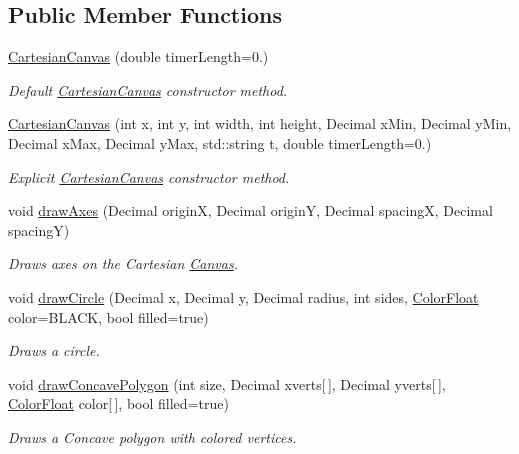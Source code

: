 \subsection*{Public Member Functions}
\begin{DoxyCompactItemize}
\item 
\hyperlink{classtsgl_1_1_cartesian_canvas_a4438f368eae3def6a70e0faa15d28daa}{Cartesian\+Canvas} (double timer\+Length=0.)
\begin{DoxyCompactList}\small\item\em Default \hyperlink{classtsgl_1_1_cartesian_canvas}{Cartesian\+Canvas} constructor method. \end{DoxyCompactList}\item 
\hyperlink{classtsgl_1_1_cartesian_canvas_a7ca80bfa69d89fdbe110a7ec3aa6f100}{Cartesian\+Canvas} (int x, int y, int width, int height, Decimal x\+Min, Decimal y\+Min, Decimal x\+Max, Decimal y\+Max, std\+::string t, double timer\+Length=0.)
\begin{DoxyCompactList}\small\item\em Explicit \hyperlink{classtsgl_1_1_cartesian_canvas}{Cartesian\+Canvas} constructor method. \end{DoxyCompactList}\item 
void \hyperlink{classtsgl_1_1_cartesian_canvas_a1b08e3c0d692603fd2bf56e38eb19907}{draw\+Axes} (Decimal origin\+X, Decimal origin\+Y, Decimal spacing\+X, Decimal spacing\+Y)
\begin{DoxyCompactList}\small\item\em Draws axes on the Cartesian \hyperlink{classtsgl_1_1_canvas}{Canvas}. \end{DoxyCompactList}\item 
void \hyperlink{classtsgl_1_1_cartesian_canvas_a64e128195cbcf9b60dbe478d6f489d67}{draw\+Circle} (Decimal x, Decimal y, Decimal radius, int sides, \hyperlink{structtsgl_1_1_color_float}{Color\+Float} color=B\+L\+A\+C\+K, bool filled=true)
\begin{DoxyCompactList}\small\item\em Draws a circle. \end{DoxyCompactList}\item 
void \hyperlink{classtsgl_1_1_cartesian_canvas_a7f84b79ab6fd77277c5c71fce7d0ec6a}{draw\+Concave\+Polygon} (int size, Decimal xverts\mbox{[}$\,$\mbox{]}, Decimal yverts\mbox{[}$\,$\mbox{]}, \hyperlink{structtsgl_1_1_color_float}{Color\+Float} color\mbox{[}$\,$\mbox{]}, bool filled=true)
\begin{DoxyCompactList}\small\item\em Draws a Concave polygon with colored vertices. \end{DoxyCompactList}\item 

\end{DoxyCompactItemize}
